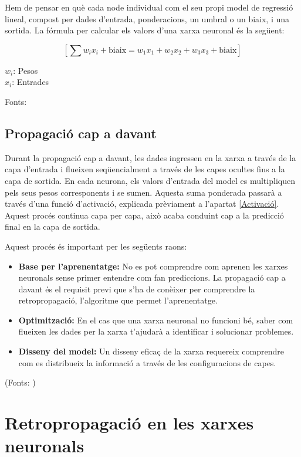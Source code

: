 Hem de pensar en què cada node individual com el seu propi model de regressió lineal, compost per dades d'entrada, ponderacions, un umbral o un biaix, i una sortida. La fórmula per calcular els valors d'una xarxa neuronal és la següent:

$$[
\sum w_i x_i + \text{biaix} = w_1 x_1 + w_2 x_2 + w_3 x_3 + \text{biaix}
]$$

$w_i$: Pesos\\
$x_i$: Entrades

Fonts: \cite{IMB_Xarxa_neuronal}

\subsection{Propagació cap a davant}\label{subsec:propagació}

Durant la propagació cap a davant, les dades ingressen en la xarxa a través de la capa d'entrada i flueixen seqüencialment a través de les capes ocultes fins a la capa de sortida. En cada neurona, els valors d'entrada del model es multipliquen pels seus pesos corresponents i se sumen. Aquesta suma ponderada passarà a través d'una funció d'activació, explicada prèviament a l'apartat \ref{Activació}. Aquest procés continua capa per capa, això acaba conduint cap a la predicció final en la capa de sortida.

Aquest procés és important per les següents raons:
\begin{itemize}
    \item \textbf{Base per l'aprenentatge:} No es pot comprendre com aprenen les xarxes neuronals sense primer entendre com fan prediccions. La propagació cap a davant és el requisit previ que s'ha de conèixer per comprendre la retropropagació, l'algoritme que permet l'aprenentatge.

    \item \textbf{Optimització:} En el cas que una xarxa neuronal no funcioni bé, saber com flueixen les dades per la xarxa t'ajudarà a identificar i solucionar problemes.

    \item \textbf{Disseny del model:} Un disseny eficaç de la xarxa requereix comprendre com es distribueix la informació a través de les configuracions de capes.
\end{itemize}
(Fonts: \cite{TreballFinalDeGrau2})
\section{Retropropagació en les xarxes neuronals}\label{subsec:retropropagació}

